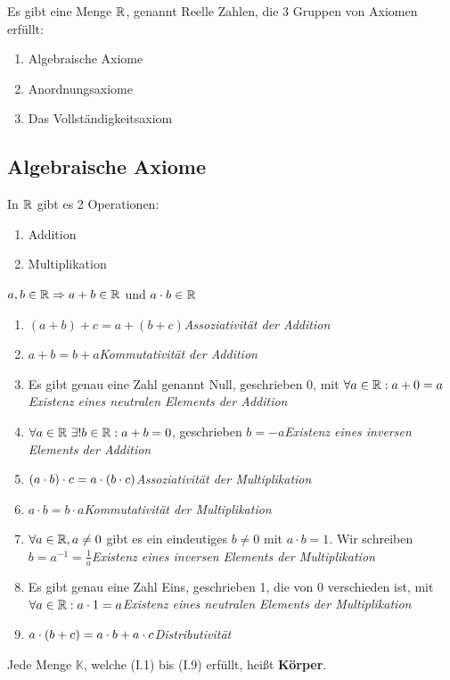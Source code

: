 \thispagestyle{pagenumberonly}

Es gibt eine Menge $\mathbb{R}$, genannt Reelle Zahlen, die 3 Gruppen von Axiomen erfüllt:
\begin{enumerate}
    \item Algebraische Axiome
    \item Anordnungsaxiome
    \item Das Vollständigkeitsaxiom
\end{enumerate}

\subsection{Algebraische Axiome}
In $\mathbb{R}$ gibt es 2 Operationen:
\begin{enumerate}
    \item Addition \anf{+}
    \item Multiplikation \anf{$\cdot$}
\end{enumerate}

\begin{folgerung}
    $a,b\in\mathbb{R}\Rightarrow{} a+b\in \mathbb{R}$ und $a \cdot b\in\mathbb{R}$
\end{folgerung}

\begin{definition}
    \theoremescape
    \begin{enumerate}[label=(I.\arabic*)]
        \item $(a+b) + c = a + (b+c)$\quad \textit{Assoziativität der Addition}
        \item $a + b = b + a$\quad \textit{Kommutativität der Addition}
        \item Es gibt genau eine Zahl genannt Null, geschrieben $0$, mit $\forall a \in\mathbb{R}: a+0 = a$ \quad \textit{Existenz eines neutralen Elements der Addition}
        \item $\forall a\in\mathbb{R}~\exists! b\in \mathbb{R}: a + b = 0$, geschrieben $b=-a$\quad \textit{Existenz eines inversen Elements der Addition}
        \item $\left(a\cdot b\right)\cdot c = a\cdot\left(b\cdot c\right)$\quad \textit{Assoziativität der Multiplikation}
        \item $a\cdot b = b \cdot a$\quad \textit{Kommutativität der Multiplikation}
        \item $\forall a \in\mathbb{R}, a \neq 0$ gibt es ein eindeutiges $b\neq 0$ mit $a\cdot b = 1$. Wir schreiben $b = a^{-1} = \frac{1}{a}$\quad \textit{Existenz eines inversen Elements der Multiplikation}
        \item Es gibt genau eine Zahl Eins, geschrieben 1, die von 0 verschieden ist, mit $\forall a\in\mathbb{R}: a\cdot 1 = a$\quad \textit{Existenz eines neutralen Elements der Multiplikation}
        \item $a\cdot\left(b+c\right) = a \cdot b + a \cdot c$\quad \textit{Distributivität}
    \end{enumerate}

    \noindent Jede Menge $\mathbb{K}$, welche (I.1) bis (I.9) erfüllt, heißt \textbf{Körper}.
\end{definition}

